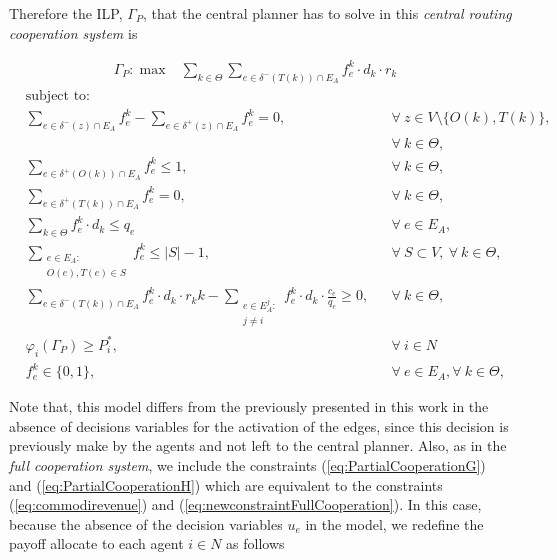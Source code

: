 \documentclass{article}
\begin{document}
Therefore the ILP, $\Gamma_P$, that the central planner has to solve in this \emph{central routing cooperation system} is

\begin{align}
        &  \Gamma_P: \max  & \sum_{k \in \Theta} \sum_{e \in \delta^-(T(k))\cap E_A}  f_e^k \cdot d_k \cdot r_k  &&   \label{eq:PartialCooperationA} 
    \end{align}
    \begin{align}
        & \text{subject to:}       && \nonumber\\
        & \sum_{e \in \delta^-(z)\cap E_A} f_e^k-\sum_{e \in \delta^+(z)\cap E_A} f_{e}^k = 0,            \quad && \forall\ z\in V\setminus\{O(k),T(k)\},\nonumber\\
& && \forall\ k\in\Theta,  \label{eq:PartialCooperationB}\\[1em]
& \sum_{e \in \delta^+(O(k))\cap E_A} f_e^k \leq 1,  && \forall\ k\in \Theta, \label{eq:PartialCooperationC} \\
& \sum_{e \in \delta^+(T(k))\cap E_A} f_e^k = 0,  && \forall\ k\in \Theta, \label{eq:PartialCooperationD} \\
 & \sum_{k \in \Theta} f_e^k\cdot d_k \leq q_e     && \forall\ e \in E_A, \label{eq:PartialCooperationE}  \\
 & \sum_{\substack{e \in E_A\colon \\ O(e),T(e) \in S}} f_e^k  \leq |S| -1,    && \forall\ S \subset V,\ \forall\ k \in \Theta, \label{eq:PartialCooperationF}\\
&\sum_{e \in \delta^-(T(k))\cap E_A}  f_e^k \cdot d_k \cdot r_kk
 -\sum_{\substack{e \in E_A^j\colon \\ j\not = i}} f_e^k \cdot d_k \cdot \frac{c_e}{q_e}\geq 0, && \forall\ k \in \Theta, \label{eq:PartialCooperationG} \\
& \varphi_i(\Gamma_P)   \geq P_i^*,     && \forall\ i\in N \label{eq:PartialCooperationH}\\
 & f_e^k  \in \{0,1\},    && \forall\ e \in E_A, \forall\ k \in \Theta, \label{eq:PartialCooperationI}
    \end{align}

Note that, this model differs from the previously presented in this work in the absence of decisions variables for the activation of the edges, since this decision is previously make by the agents and not left to the central planner. Also, as in the \emph{full cooperation system}, we include the constraints (\ref{eq:PartialCooperationG}) and (\ref{eq:PartialCooperationH})
which are equivalent to the constraints (\ref{eq:commodirevenue}) and (\ref{eq:newconstraintFullCooperation}). In this case, because the absence of the decision variables $u_e$ in the model, we redefine the payoff allocate to each agent $i\in N$ as follows
\end{document}
